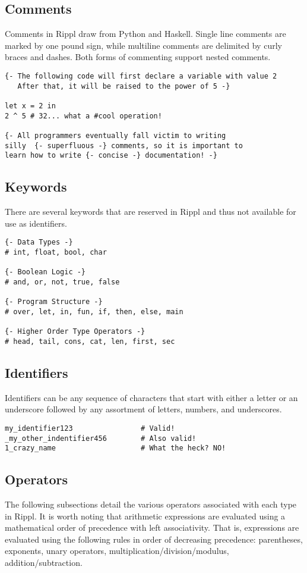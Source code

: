 \documentclass[5pt]{article}
\begin{document}
\newpage 
\subsection{Comments}
Comments in Rippl draw from Python and Haskell. Single line comments are marked by one pound sign, while multiline comments are delimited by curly braces and dashes. Both forms of commenting support nested comments.
\begin{lstlisting}[language=rippl]
{- The following code will first declare a variable with value 2
   After that, it will be raised to the power of 5 -}
   
let x = 2 in
2 ^ 5 # 32... what a #cool operation!

{- All programmers eventually fall victim to writing 
silly  {- superfluous -} comments, so it is important to 
learn how to write {- concise -} documentation! -}
\end{lstlisting}
\subsection{Keywords}
There are several keywords that are reserved in Rippl and thus not available for use as identifiers.
\begin{lstlisting}[language=rippl]
{- Data Types -}
# int, float, bool, char

{- Boolean Logic -}
# and, or, not, true, false

{- Program Structure -}
# over, let, in, fun, if, then, else, main

{- Higher Order Type Operators -}
# head, tail, cons, cat, len, first, sec
\end{lstlisting}
\subsection{Identifiers}
Identifiers can be any sequence of characters that start with either a letter or an underscore followed by any assortment of letters, numbers, and underscores.
\begin{lstlisting}[language=rippl]
my_identifier123 				# Valid!
_my_other_indentifier456  		# Also valid!
1_crazy_name					# What the heck? NO!
\end{lstlisting}
\newpage
\subsection{Operators}
The following subsections detail the various operators associated with each type in Rippl. It is worth noting that arithmetic expressions are evaluated using a mathematical
order of precedence with left associativity. That is, expressions are evaluated using the following rules in order of decreasing precedence: parentheses, exponents, unary operators, multiplication/division/modulus, addition/subtraction. 
\end{document}
